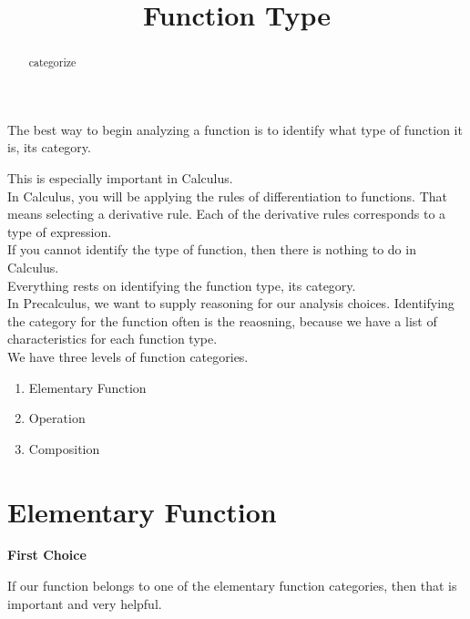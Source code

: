 \documentclass{ximera}
\title{Function Type}
\begin{document}
\begin{abstract}
categorize
\end{abstract}
\maketitle








The best way to begin analyzing a function is to identify what type of function it is, its category.

This is especially important in Calculus.   \\


In Calculus, you will be applying the rules of differentiation to functions. That means selecting a derivative rule.  Each of the derivative rules corresponds to a type of expression. \\

If you cannot identify the type of function, then there is nothing to do in Calculus. \\

Everything rests on identifying the function type, its category. \\



In Precalculus, we want to supply reasoning for our analysis choices.  Identifying the category for the function often is the reaosning, because we have a list of characteristics for each function type. \\



We have three levels of function categories.

\begin{enumerate}
    \item Elementary Function
    \item Operation
    \item Composition
\end{enumerate} 



\section*{Elementary Function}

\textbf{\textcolor{purple!85!blue}{First Choice}} 


If our function belongs to one of the elementary function categories, then that is important and very helpful. \\
\end{document}

